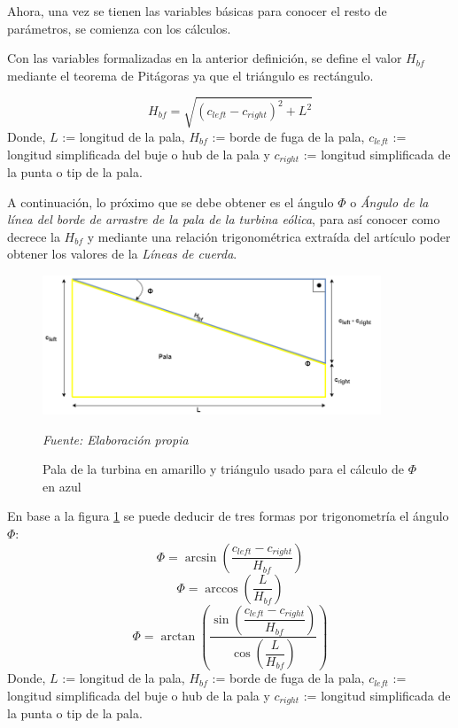 Ahora, una vez se tienen las variables básicas para conocer el resto de parámetros, se comienza con los cálculos.

\begin{definicion}
Con las variables formalizadas en la anterior definición, se define el valor $H_{bf}$ mediante el teorema de Pitágoras ya que el triángulo es rectángulo.

$$ H_{bf} = \sqrt{(c_{left} - c_{right})^{2} + L^{2}}$$
Donde,
\centering
$L$ := longitud de la pala, $H_{bf}$ := borde de fuga de la pala, $c_{left}$ := longitud simplificada del buje o hub de la pala y $c_{right}$ := longitud simplificada de la punta o tip de la pala.
\label{def_hipotenusa_pala}
\end{definicion}


A continuación, lo próximo que se debe obtener es el ángulo $\Phi$ o \textit{Ángulo de la línea del borde de arrastre de la pala de la turbina eólica}, para así conocer como decrece la $H_{bf}$ y mediante una relación trigonométrica extraída del artículo \cite{armenta2021predictive} poder obtener los valores de la \textit{Líneas de cuerda}.

\begin{figure}[H]
    \centering
    \includegraphics[width=0.9\textwidth]{images/triangulo sacar phi.drawio.png}
    \caption{Pala de la turbina en amarillo y triángulo usado para el cálculo de $\Phi$ en azul}
    \textit{Fuente: Elaboración propia}
    \label{fig:pala_calculo_phi}
\end{figure}

\begin{definicion}
En base a la figura \ref{fig:pala_calculo_phi} se puede deducir de tres formas por trigonometría el ángulo $\Phi$:
$$ \Phi = \arcsin{(\dfrac{c_{left} - c_{right}}{H_{bf}})} $$
$$ \Phi = \arccos{(\dfrac{L}{H_{bf}})} $$
$$ \Phi = \arctan{( \dfrac{\sin{(\dfrac{c_{left} - c_{right}}{H_{bf}})}}{\cos{(\dfrac{L}{H_{bf}})}} ) } $$
Donde,
\centering
$L$ := longitud de la pala, $H_{bf}$ := borde de fuga de la pala, $c_{left}$ := longitud simplificada del buje o hub de la pala y $c_{right}$ := longitud simplificada de la punta o tip de la pala.
\label{def_angulo_phi}
\end{definicion}


